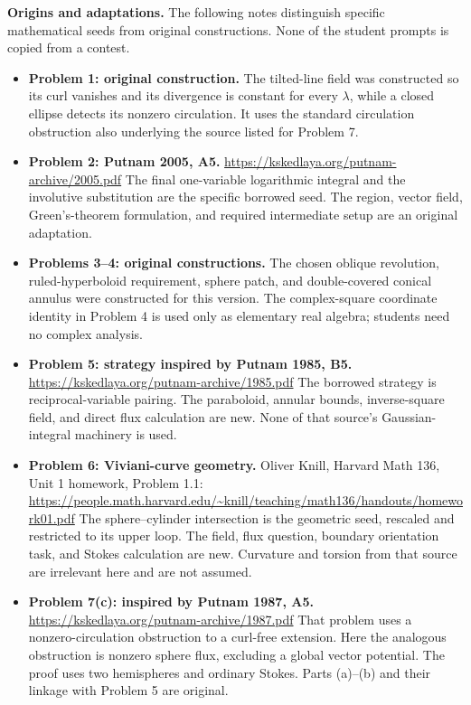 \documentclass[11pt,letterpaper]{article}
\begin{document}
\textbf{Origins and adaptations.}
The following notes distinguish specific mathematical seeds from original
constructions. None of the student prompts is copied from a contest.

\begin{itemize}[itemsep=5pt]
\item \textbf{Problem 1: original construction.} The tilted-line field
was constructed so its curl vanishes and its divergence is constant for
every $\lambda$, while a closed ellipse detects its nonzero circulation.
It uses the standard circulation obstruction also underlying the source
listed for Problem 7.
\item \textbf{Problem 2: Putnam 2005, A5.}
\url{https://kskedlaya.org/putnam-archive/2005.pdf}
The final one-variable logarithmic integral and the involutive substitution
are the specific borrowed seed. The region, vector field, Green's-theorem
formulation, and required intermediate setup are an original adaptation.
\item \textbf{Problems 3--4: original constructions.} The chosen oblique
revolution, ruled-hyperboloid requirement, sphere patch, and double-covered
conical annulus were constructed for this version. The complex-square
coordinate identity in Problem 4 is used only as elementary real algebra;
students need no complex analysis.
\item \textbf{Problem 5: strategy inspired by Putnam 1985, B5.}
\url{https://kskedlaya.org/putnam-archive/1985.pdf}
The borrowed strategy is reciprocal-variable pairing. The paraboloid,
annular bounds, inverse-square field, and direct flux calculation are
new. None of that source's Gaussian-integral machinery is used.
\item \textbf{Problem 6: Viviani-curve geometry.} Oliver Knill,
Harvard Math 136, Unit 1 homework, Problem 1.1:
\url{https://people.math.harvard.edu/~knill/teaching/math136/handouts/homework01.pdf}
The sphere--cylinder intersection is the geometric seed, rescaled and
restricted to its upper loop. The field, flux question, boundary
orientation task, and Stokes calculation are new. Curvature and torsion
from that source are irrelevant here and are not assumed.
\item \textbf{Problem 7(c): inspired by Putnam 1987, A5.}
\url{https://kskedlaya.org/putnam-archive/1987.pdf}
That problem uses a nonzero-circulation obstruction to a curl-free
extension. Here the analogous obstruction is nonzero sphere flux,
excluding a global vector potential. The proof uses two hemispheres
and ordinary Stokes. Parts (a)--(b) and their linkage with Problem 5
are original.
\end{itemize}
\end{document}
